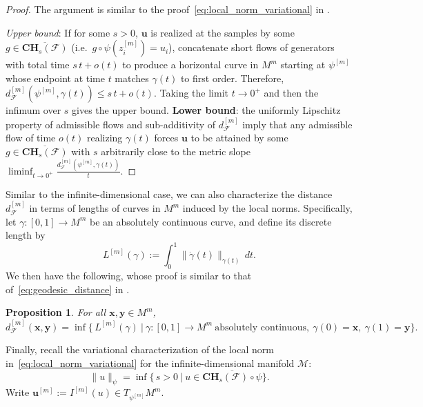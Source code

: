 \documentclass[12pt]{amsart}
\numberwithin{equation}{section}
\newtheorem{proposition}{Proposition}[section]
\theoremstyle{remark}
\begin{document}
\begin{proof}
  The argument is similar to the proof~\eqref{eq:local_norm_variational} in .

\emph{Upper bound}: If for some $s>0$, \(\mathbf u\) is realized at the samples by some \(g\in \overline{\mathbf{CH}_s(\mathcal F)}\) (i.e.\ \(g\circ\psi(z^{[m]}_i)=u_i\)), concatenate short flows of generators with total time \(s\,t+o(t)\)
to produce a horizontal curve in \(M^m\) starting at \(\psi^{[m]}\) whose endpoint at time \(t\) matches \(\gamma(t)\) to first order. Therefore,
\(d_{\mathcal F}^{[m]}(\psi^{[m]},\gamma(t))\le s\,t+o(t)\). Taking the limit \(t\to 0^+\) and then the infimum over \(s\) gives the upper bound.
\textbf{Lower bound}: the uniformly Lipschitz property of admissible flows and sub-additivity of \(d_{\mathcal F}^{[m]}\) imply that any admissible flow
of time \(o(t)\) realizing \(\gamma(t)\) forces \(\mathbf u\) to be attained by some \(g\in \overline{\mathbf{CH}_s(\mathcal F)}\) with \(s\) arbitrarily close to the metric slope \(\liminf_{t\to 0^+} \frac{d_{\mathcal F}^{[m]}(\psi^{[m]},\gamma(t))}{t}\).
\end{proof}

Similar to the infinite-dimensional case, we can also characterize the distance \(d_{\mathcal F}^{[m]}\) in terms of lengths of curves in \(M^m\) induced by the local norms.
Specifically, let \(\gamma:[0,1]\to M^m\) be an absolutely continuous curve, and define its discrete length by
\begin{equation}
L^{[m]}(\gamma):=\int_0^1 \big\|\dot\gamma(t)\big\|_{\gamma(t)}\,dt.
\end{equation}
We then have the following, whose proof is similar to that of~\eqref{eq:geodesic_distance} in .

\begin{proposition}
\label{prop:discrete_geodesic}
For all \(\mathbf x,\mathbf y\in M^m\),
\begin{equation}
\label{eq:discrete_cc}
d_{\mathcal F}^{[m]}(\mathbf x,\mathbf y)
=\inf\Big\{\, L^{[m]}(\gamma)\ \Big|\ \gamma:[0,1]\to M^m\ \text{absolutely continuous},\ \gamma(0)=\mathbf x,\ \gamma(1)=\mathbf y\Big\}.
\end{equation}
\end{proposition}

Finally, recall the variational characterization of the local norm in~\eqref{eq:local_norm_variational} for the infinite-dimensional manifold \(\mathcal M\):
\begin{equation}
\label{eq:cont_local_norm}
\|u\|_{\psi}=\inf\Big\{\, s>0\ \Big|\ u\in \overline{\mathbf{CH}_s(\mathcal F)\circ\psi}\Big\}.
\end{equation}
Write \(\mathbf u^{[m]}:=I^{[m]}(u)\in T_{\psi^{[m]}}M^m\).
\end{document}
